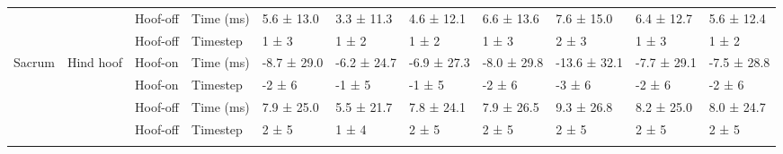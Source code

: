 \begin{sidewaystable}[!htbp]
{\begin{tabular}{p{3cm}p{2cm}p{2cm}p{2cm}p{1.5cm}p{1.5cm}p{1.5cm}p{1.5cm}p{1.5cm}p{1.5cm}p{1.5cm}}
                                  &                                                & \multicolumn{1}{l}{Hoof-off} & \multicolumn{1}{l}{Time (ms)} & \multicolumn{1}{l}{5.6 ± 13.0}  & \multicolumn{1}{l}{3.3 ± 11.3}  & \multicolumn{1}{l}{4.6 ± 12.1}  & \multicolumn{1}{l}{6.6 ± 13.6}  & \multicolumn{1}{l}{7.6 ± 15.0}   & \multicolumn{1}{l}{6.4 ± 12.7}  & 5.6 ± 12.4  \\
                                  &                                                & \multicolumn{1}{l}{Hoof-off} & \multicolumn{1}{l}{Timestep}  & \multicolumn{1}{l}{1 ± 3}       & \multicolumn{1}{l}{1 ± 2}       & \multicolumn{1}{l}{1 ± 2}       & \multicolumn{1}{l}{1 ± 3}       & \multicolumn{1}{l}{2 ± 3}        & \multicolumn{1}{l}{1 ± 3}       & 1 ± 2       \\
                                  \midrule
\multicolumn{1}{l}{Sacrum}           & \multicolumn{1}{l}{Hind hoof} & \multicolumn{1}{l}{Hoof-on}  & \multicolumn{1}{l}{Time (ms)} & \multicolumn{1}{l}{-8.7 ± 29.0} & \multicolumn{1}{l}{-6.2 ± 24.7} & \multicolumn{1}{l}{-6.9 ± 27.3} & \multicolumn{1}{l}{-8.0 ± 29.8} & \multicolumn{1}{l}{-13.6 ± 32.1} & \multicolumn{1}{l}{-7.7 ± 29.1} & -7.5 ± 28.8 \\
                                  & \multicolumn{1}{l}{}                           & \multicolumn{1}{l}{Hoof-on}  & \multicolumn{1}{l}{Timestep}  & \multicolumn{1}{l}{-2 ± 6}      & \multicolumn{1}{l}{-1 ± 5}      & \multicolumn{1}{l}{-1 ± 5}      & \multicolumn{1}{l}{-2 ± 6}      & \multicolumn{1}{l}{-3 ± 6}       & \multicolumn{1}{l}{-2 ± 6}      & -2 ± 6      \\
                                  & \multicolumn{1}{l}{}                           & \multicolumn{1}{l}{Hoof-off} & \multicolumn{1}{l}{Time (ms)} & \multicolumn{1}{l}{7.9 ± 25.0}  & \multicolumn{1}{l}{5.5 ± 21.7}  & \multicolumn{1}{l}{7.8 ± 24.1}  & \multicolumn{1}{l}{7.9 ± 26.5}  & \multicolumn{1}{l}{9.3 ± 26.8}   & \multicolumn{1}{l}{8.2 ± 25.0}  & 8.0 ± 24.7  \\
                                  & \multicolumn{1}{l}{}                           & \multicolumn{1}{l}{Hoof-off} & \multicolumn{1}{l}{Timestep}  & \multicolumn{1}{l}{2 ± 5}       & \multicolumn{1}{l}{1 ± 4}       & \multicolumn{1}{l}{2 ± 5}       & \multicolumn{1}{l}{2 ± 5}       & \multicolumn{1}{l}{2 ± 5}        & \multicolumn{1}{l}{2 ± 5}       & 2 ± 5\\  
                                  \bottomrule
                                   \label{results_of_models}
\end{tabular}}
\end{sidewaystable}